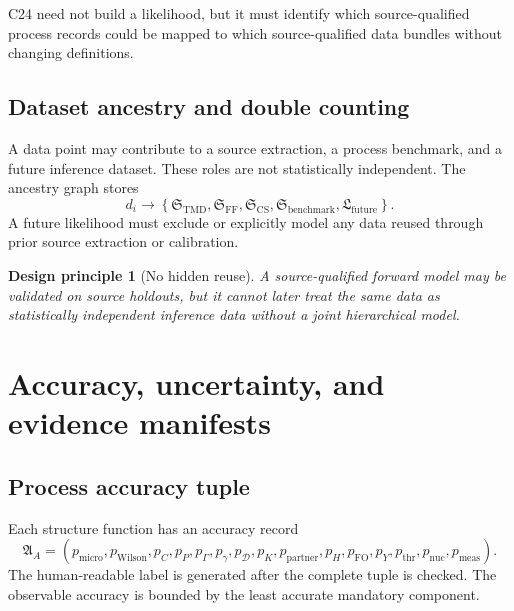 \documentclass[11pt]{article}
\newtheorem{principle}[definition]{Design principle}
\newcommand{\CS}{\ensuremath{\mathrm{CS}}}
\newcommand{\cD}{\mathcal D}
\newcommand{\FF}{\ensuremath{\mathrm{FF}}}
\newcommand{\FO}{\ensuremath{\mathrm{FO}}}
\begin{document}
C24 need not build a likelihood, but it must identify which source-qualified process records could be mapped to which source-qualified data bundles without changing definitions.

\subsection{Dataset ancestry and double counting}

A data point may contribute to a source extraction, a process benchmark, and a future inference dataset.  These roles are not statistically independent.  The ancestry graph stores
\begin{equation}
 d_i
 \longrightarrow
 \left\{
 \mathfrak S_{\mathrm{TMD}},
 \mathfrak S_{\FF},
 \mathfrak S_{\CS},
 \mathfrak S_{\mathrm{benchmark}},
 \mathfrak L_{\mathrm{future}}
 \right\}.
 \label{eq:data-ancestry}
\end{equation}
A future likelihood must exclude or explicitly model any data reused through prior source extraction or calibration.

\begin{principle}[No hidden reuse]
A source-qualified forward model may be validated on source holdouts, but it cannot later treat the same data as statistically independent inference data without a joint hierarchical model.
\end{principle}

\section{Accuracy, uncertainty, and evidence manifests}
\label{sec:accuracy}

\subsection{Process accuracy tuple}

Each structure function has an accuracy record
\begin{equation}
 \mathfrak A_A
 =
 \left(
 p_{\mathrm{micro}},
 p_{\mathrm{Wilson}},
 p_C,
 p_P,
 p_\Gamma,
 p_\gamma,
 p_{\cD},
 p_K,
 p_{\mathrm{partner}},
 p_H,
 p_{\FO},
 p_Y,
 p_{\mathrm{thr}},
 p_{\mathrm{nuc}},
 p_{\mathrm{meas}}
 \right).
 \label{eq:accuracy-tuple}
\end{equation}
The human-readable label is generated after the complete tuple is checked.  The observable accuracy is bounded by the least accurate mandatory component.
\end{document}
